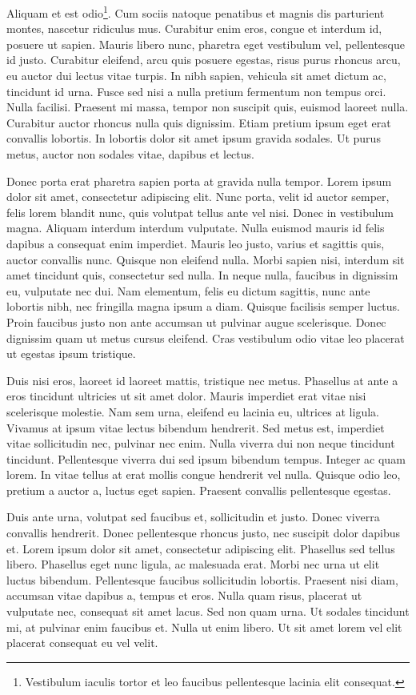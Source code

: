 Aliquam et est odio\footnote{Vestibulum iaculis tortor et leo faucibus pellentesque lacinia elit consequat.}. Cum sociis natoque penatibus et magnis dis parturient montes, nascetur ridiculus mus. Curabitur enim eros, congue et interdum id, posuere ut sapien. Mauris libero nunc, pharetra eget vestibulum vel, pellentesque id justo. Curabitur eleifend, arcu quis posuere egestas, risus purus rhoncus arcu, eu auctor dui lectus vitae turpis. In nibh sapien, vehicula sit amet dictum ac, tincidunt id urna. Fusce sed nisi a nulla pretium fermentum non tempus orci. Nulla facilisi. Praesent mi massa, tempor non suscipit quis, euismod laoreet nulla. Curabitur auctor rhoncus nulla quis dignissim. Etiam pretium ipsum eget erat convallis lobortis. In lobortis dolor sit amet ipsum gravida sodales. Ut purus metus, auctor non sodales vitae, dapibus et lectus.

Donec porta erat pharetra sapien porta at gravida nulla tempor. Lorem ipsum dolor sit amet, consectetur adipiscing elit. Nunc porta, velit id auctor semper, felis lorem blandit nunc, quis volutpat tellus ante vel nisi. Donec in vestibulum magna. Aliquam interdum interdum vulputate. Nulla euismod mauris id felis dapibus a consequat enim imperdiet. Mauris leo justo, varius et sagittis quis, auctor convallis nunc. Quisque non eleifend nulla. Morbi sapien nisi, interdum sit amet tincidunt quis, consectetur sed nulla. In neque nulla, faucibus in dignissim eu, vulputate nec dui. Nam elementum, felis eu dictum sagittis, nunc ante lobortis nibh, nec fringilla magna ipsum a diam. Quisque facilisis semper luctus. Proin faucibus justo non ante accumsan ut pulvinar augue scelerisque. Donec dignissim quam ut metus cursus eleifend. Cras vestibulum odio vitae leo placerat ut egestas ipsum tristique.

Duis nisi eros, laoreet id laoreet mattis, tristique nec metus. Phasellus at ante a eros tincidunt ultricies ut sit amet dolor. Mauris imperdiet erat vitae nisi scelerisque molestie. Nam sem urna, eleifend eu lacinia eu, ultrices at ligula. Vivamus at ipsum vitae lectus bibendum hendrerit. Sed metus est, imperdiet vitae sollicitudin nec, pulvinar nec enim. Nulla viverra dui non neque tincidunt tincidunt. Pellentesque viverra dui sed ipsum bibendum tempus. Integer ac quam lorem. In vitae tellus at erat mollis congue hendrerit vel nulla. Quisque odio leo, pretium a auctor a, luctus eget sapien. Praesent convallis pellentesque egestas.

Duis ante urna, volutpat sed faucibus et, sollicitudin et justo. Donec viverra convallis hendrerit. Donec pellentesque rhoncus justo, nec suscipit dolor dapibus et. Lorem ipsum dolor sit amet, consectetur adipiscing elit. Phasellus sed tellus libero. Phasellus eget nunc ligula, ac malesuada erat. Morbi nec urna ut elit luctus bibendum. Pellentesque faucibus sollicitudin lobortis. Praesent nisi diam, accumsan vitae dapibus a, tempus et eros. Nulla quam risus, placerat ut vulputate nec, consequat sit amet lacus. Sed non quam urna. Ut sodales tincidunt mi, at pulvinar enim faucibus et. Nulla ut enim libero. Ut sit amet lorem vel elit placerat consequat eu vel velit.

